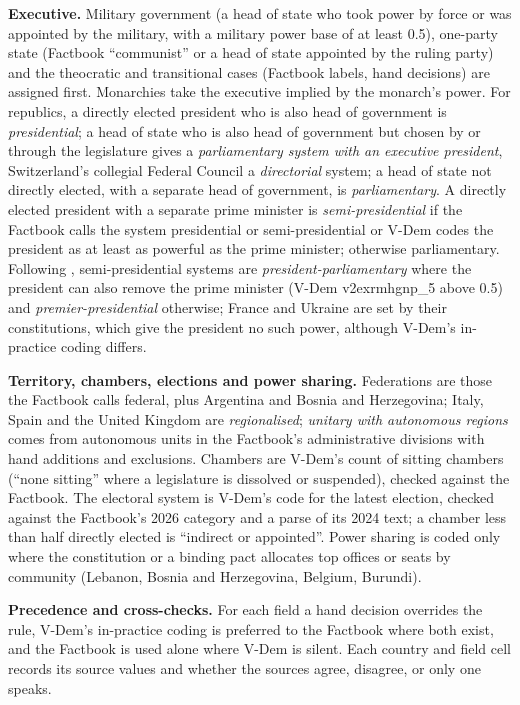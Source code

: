 \documentclass[11pt,a4paper]{article}
\begin{document}
\textbf{Executive.} Military government (a head of state who took power by force or was appointed by the military, with a military power base of at least 0.5), one-party state (Factbook ``communist'' or a head of state appointed by the ruling party) and the theocratic and transitional cases (Factbook labels, hand decisions) are assigned first. Monarchies take the executive implied by the monarch's power. For republics, a directly elected president who is also head of government is \emph{presidential}; a head of state who is also head of government but chosen by or through the legislature gives a \emph{parliamentary system with an executive president}, Switzerland's collegial Federal Council a \emph{directorial} system; a head of state not directly elected, with a separate head of government, is \emph{parliamentary}. A directly elected president with a separate prime minister is \emph{semi-presidential} if the Factbook calls the system presidential or semi-presidential or V-Dem codes the president as at least as powerful as the prime minister; otherwise parliamentary. Following \citet{shugartcarey}, semi-presidential systems are \emph{president-parliamentary} where the president can also remove the prime minister (V-Dem v2exrmhgnp\_5 above 0.5) and \emph{premier-presidential} otherwise; France and Ukraine are set by their constitutions, which give the president no such power, although V-Dem's in-practice coding differs.

\textbf{Territory, chambers, elections and power sharing.} Federations are those the Factbook calls federal, plus Argentina and Bosnia and Herzegovina; Italy, Spain and the United Kingdom are \emph{regionalised}; \emph{unitary with autonomous regions} comes from autonomous units in the Factbook's administrative divisions with hand additions and exclusions. Chambers are V-Dem's count of sitting chambers (``none sitting'' where a legislature is dissolved or suspended), checked against the Factbook. The electoral system is V-Dem's code for the latest election, checked against the Factbook's 2026 category and a parse of its 2024 text; a chamber less than half directly elected is ``indirect or appointed''. Power sharing is coded only where the constitution or a binding pact allocates top offices or seats by community (Lebanon, Bosnia and Herzegovina, Belgium, Burundi).

\textbf{Precedence and cross-checks.} For each field a hand decision overrides the rule, V-Dem's in-practice coding is preferred to the Factbook where both exist, and the Factbook is used alone where V-Dem is silent. Each country and field cell records its source values and whether the sources agree, disagree, or only one speaks.
\end{document}
